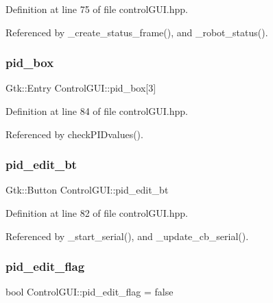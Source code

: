 Definition at line 75 of file control\+G\+U\+I.\+hpp.



Referenced by \+\_\+create\+\_\+status\+\_\+frame(), and \+\_\+robot\+\_\+status().

\mbox{\label{class_control_g_u_i_ad442701491f6de30be3078a6795af07a}} 
\subsubsection{\texorpdfstring{pid\+\_\+box}{pid\_box}}
{\footnotesize\ttfamily Gtk\+::\+Entry Control\+G\+U\+I\+::pid\+\_\+box\mbox{[}3\mbox{]}}



Definition at line 84 of file control\+G\+U\+I.\+hpp.



Referenced by check\+P\+I\+Dvalues().

\mbox{\label{class_control_g_u_i_a25b5eb5bf471a963e86624d3fa2c39a7}} 
\subsubsection{\texorpdfstring{pid\+\_\+edit\+\_\+bt}{pid\_edit\_bt}}
{\footnotesize\ttfamily Gtk\+::\+Button Control\+G\+U\+I\+::pid\+\_\+edit\+\_\+bt}



Definition at line 82 of file control\+G\+U\+I.\+hpp.



Referenced by \+\_\+start\+\_\+serial(), and \+\_\+update\+\_\+cb\+\_\+serial().

\mbox{\label{class_control_g_u_i_a28c8737ebe51274b23eaa55acad740a5}} 
\subsubsection{\texorpdfstring{pid\+\_\+edit\+\_\+flag}{pid\_edit\_flag}}
{\footnotesize\ttfamily bool Control\+G\+U\+I\+::pid\+\_\+edit\+\_\+flag = false}



